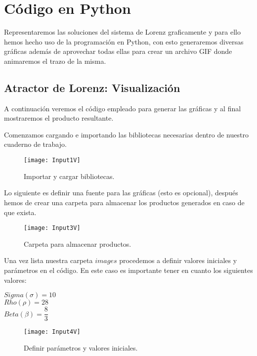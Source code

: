 \section{Código en Python}
Representaremos las soluciones del sistema de Lorenz graficamente y para ello hemos hecho uso de la programación  en Python, con esto generaremos diversas gráficas además de aprovechar todas ellas para crear un archivo GIF donde animaremos el trazo de la misma.

\subsection{Atractor de Lorenz: Visualización}
A continuación veremos el código empleado para generar las gráficas y al final mostraremos el producto resultante.

Comenzamos cargando e importando las bibliotecas necesarias dentro de nuestro cuaderno de trabajo.

\begin{figure}[h!]
	\begin{center}
	\texttt{[image: Input1V]}
    \caption{Importar y cargar bibliotecas.}
    \label{fig1:bibliotecas}
	\end{center}
\end{figure}

Lo siguiente es definir una fuente para las gráficas (esto es opcional), después hemos de crear una carpeta para almacenar los productos generados en caso de que exista.

\begin{figure}[h!]
	\begin{center}
		\texttt{[image: Input3V]}
        \caption{Carpeta para almacenar productos.}
        \label{fig2:folder}
	\end{center}
\end{figure}

Una vez lista nuestra carpeta $images$ procedemos a definir valores iniciales y parámetros en el código. En este caso es importante tener en cuanto los siguientes valores:

\begin{center}
	$ Sigma ( \sigma ) = 10 $ \\
    $ Rho ( \rho ) = 28 $ \\
    $ Beta ( \beta ) = \dfrac{8}{3} $
\end{center}

\begin{figure}[h!]
	\begin{center}
		\texttt{[image: Input4V]}
        \caption{Definir parámetros y valores iniciales.}
        \label{fig3:Parametros}
	\end{center}
\end{figure}

